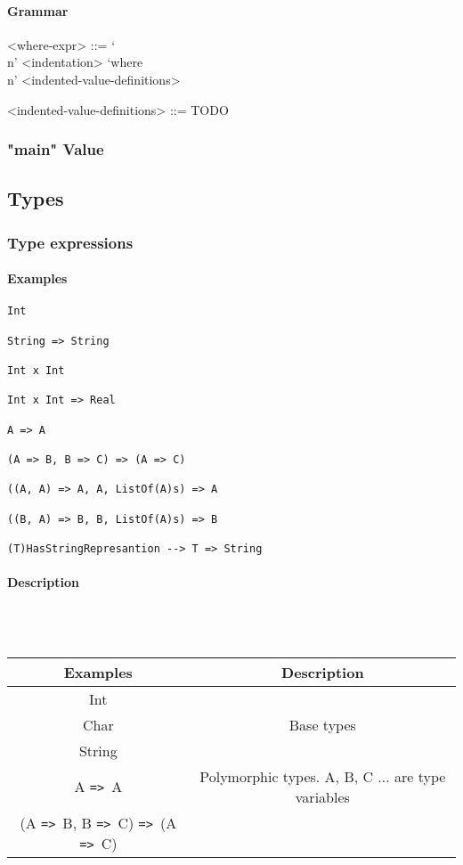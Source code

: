 \documentclass{article}
\def\ra{\texttt{=>}\ }
\def\pend{\mbox{} \\\\}
\begin{document}
\paragraph{Grammar}
\begin{grammar}
<where-expr> ::= `\\n' <indentation> `where\\n' <indented-value-definitions>

<indented-value-definitions> ::= TODO
\end{grammar}

\subsubsection{"main" Value}

\subsection{Types}

\subsubsection{Type expressions}

\paragraph{Examples}

\begin{verbatim}
Int

String => String 

Int x Int 

Int x Int => Real

A => A

(A => B, B => C) => (A => C)

((A, A) => A, A, ListOf(A)s) => A

((B, A) => B, B, ListOf(A)s) => B

(T)HasStringRepresantion --> T => String
\end{verbatim}

\paragraph{Description}\pend
\begin{tabular}{ |c|c| } 
\hline
Examples & Description \\ 
\hline
\hline
Int & \\
Char & Base types \\
String & \\ 
\hline
A \ra A &
Polymorphic types. A, B, C ... are type variables
\\
(A \ra B, B \ra C) \ra (A \ra C) &
\\ 
\hline
\end{tabular}
\end{document}
